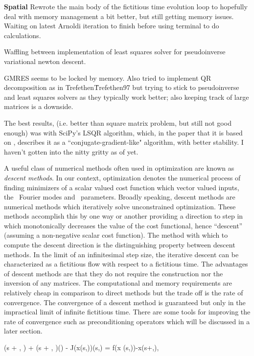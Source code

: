 {\bf Spatial {\Descent}}
Rewrote the main body of the fictitious time evolution loop to hopefully deal
with memory management a bit better, but still getting memory issues.
Waiting on latest Arnoldi iteration to finish before using terminal to do calculations.

Waffling between implementation of least squares solver for pseudoinverse variational
{newton descent}.

GMRES seems to be locked by memory.
Also tried to implement QR decomposition as in Trefethen\r{Trefethen97}
but trying to stick to pseudoinverse and least squares solvers as they
typically work better; also keeping track of large matrices is a downside.

The best results, (i.e. better than square matrix problem, but still not
good enough) was with SciPy's LSQR algorithm, which, in the paper that
it is based on , describes it as a ``conjugate-gradient-like" algorithm,
with better stability. I haven't gotten into the nitty gritty as of yet.

A useful class of numerical methods often used in optimization are known
as \textit{descent methods}. In our context, optimization denotes the numerical process
of finding minimizers of a scalar valued cost function which vector valued inputs, the \spt\
Fourier modes and \spt\ parameters. Broadly speaking, descent methods are numerical methods
which iteratively solve unconstrained optimization. These methods accomplish this by one
way or another providing a direction to step in which monotonically decreases the value of
the cost functional, hence ``descent'' (assuming a non-negative scalar cost function).
The method with which to compute the descent direction is the distinguishing property
between descent methods. In the limit of an infinitesimal step size, the iterative descent
can be characterized as a fictitious flow with respect to a fictitious time\rf{LCC06}.
The advantages of descent methods are that they do not require the construction nor
the inversion of any matrices. The computational and memory requirements
are relatively cheap in comparison to direct methods but the trade off is the
rate of convergence. The convergence of a descent method
is guaranteed but only in the impractical limit of infinite fictitious time.
There are some tools for improving the rate of convergence such as preconditioning
operators which will be discussed in a later section.


\beq
{}(s + \omega, \tau) + 
(s + \omega, \tau)\frac{\partial \omega}{\partial \tau}(\tau) - J(x(s,\tau))(s,\tau) =
f(x (s,\tau))-x(s+\omega,\tau),


